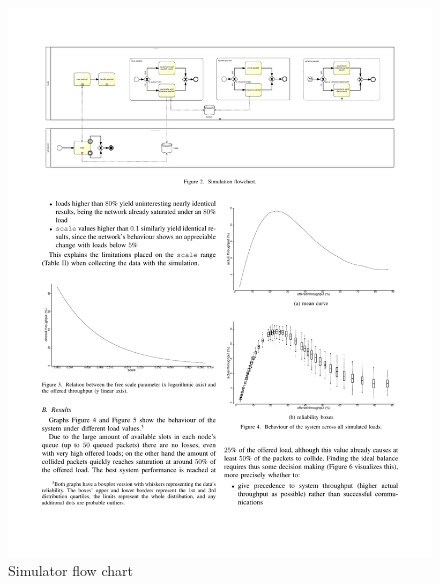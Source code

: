 \documentclass[conference]{IEEEtran}
\begin{document}
\begin{figure}[t]
    \centering
    \includegraphics[width=\textwidth]{graphs/FlowChart}
    \caption{Simulator flow chart}
    \label{fig:flowchart}
\end{figure}
\end{document}
